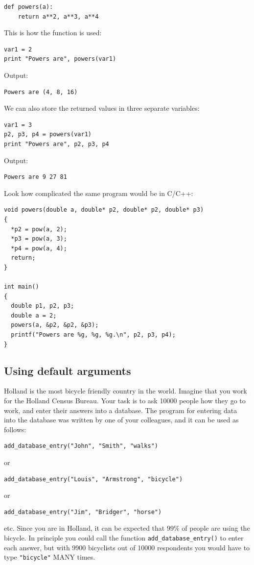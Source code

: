 \begin{verbatim}
def powers(a):
    return a**2, a**3, a**4
\end{verbatim}
This is how the function is used:

\begin{verbatim}
var1 = 2
print "Powers are", powers(var1)
\end{verbatim}
Output:

\begin{verbatim}
Powers are (4, 8, 16)
\end{verbatim}
We can also store the returned values in three separate variables:

\begin{verbatim}
var1 = 3
p2, p3, p4 = powers(var1)
print "Powers are", p2, p3, p4
\end{verbatim}
Output:

\begin{verbatim}
Powers are 9 27 81
\end{verbatim}
Look how complicated the same program would be in C/C++:

\begin{verbatim}
void powers(double a, double* p2, double* p2, double* p3)
{
  *p2 = pow(a, 2);
  *p3 = pow(a, 3);
  *p4 = pow(a, 4);
  return;
}

int main()
{
  double p1, p2, p3;
  double a = 2;
  powers(a, &p2, &p2, &p3);
  printf("Powers are %g, %g, %g.\n", p2, p3, p4);
}
\end{verbatim}

\subsection{Using default arguments}

Holland is the most bicycle friendly country in the world. Imagine that you 
work for the Holland Census Bureau. Your task is to ask 10000 
people how they go to work, and enter their answers into a database. 
The program for entering data into the database was written by one of 
your colleagues, and it can be used as follows:

\begin{verbatim}
add_database_entry("John", "Smith", "walks")
\end{verbatim}
or 
\begin{verbatim}
add_database_entry("Louis", "Armstrong", "bicycle")
\end{verbatim}
or
\begin{verbatim}
add_database_entry("Jim", "Bridger", "horse")
\end{verbatim}
etc. Since you are in Holland, it can be expected that $99 \%$ of people 
are using the bicycle. In principle you could call the function {\tt add\_database\_entry()} 
to enter each answer, but with 9900 bicyclists out of 10000 respondents you would have to 
type {\tt "bicycle"} MANY times. 

